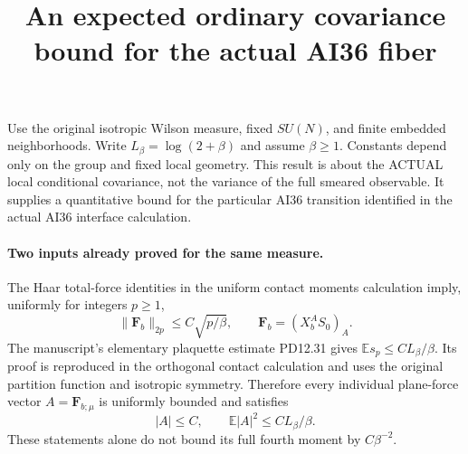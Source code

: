 \documentclass[11pt]{article}
\title{An expected ordinary covariance bound for the actual AI36 fiber}\author{}\date{}
\newcommand{\E}{\mathbb E}
\begin{document}
\maketitle
Use the original isotropic Wilson measure, fixed $SU(N)$, and finite embedded neighborhoods.
Write $L_\beta=\log(2+\beta)$ and assume $\beta\ge1$. Constants depend only on the group
and fixed local geometry. This result is about the ACTUAL local conditional covariance,
not the variance of the full smeared observable. It supplies a quantitative bound for the
particular AI36 transition identified in the actual AI36 interface calculation.

\paragraph{Two inputs already proved for the same measure.}
The Haar total-force identities in the uniform contact moments calculation imply, uniformly for integers $p\ge1$,
\[
 \|\mathbf F_b\|_{2p}\le C\sqrt{p/\beta},\qquad \mathbf F_b=(X_b^AS_0)_A.
\]
The manuscript's elementary plaquette estimate PD12.31 gives
$\E s_p\le C L_\beta/\beta$. Its proof is reproduced in the orthogonal contact calculation and uses the original
partition function and isotropic symmetry. Therefore every individual plane-force vector
$A=\mathbf F_{b;\mu}$ is uniformly bounded and satisfies
\[
 |A|\le C,\qquad \E|A|^2\le C L_\beta/\beta.
\]
These statements alone do not bound its full fourth moment by $C\beta^{-2}$.
\end{document}
